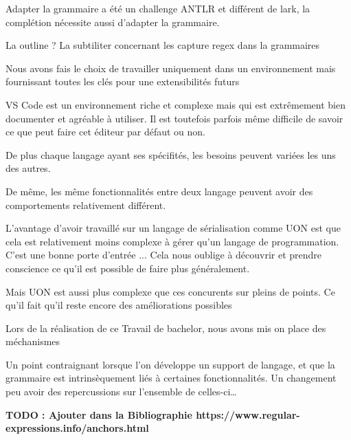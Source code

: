 \documentclass[
    iict, %
    il, %
]{heig-tb}
\begin{document}
Adapter la grammaire a été un challenge ANTLR et différent de lark, la complétion nécessite aussi d'adapter la grammaire.

La outline ?
La subtiliter concernant les capture regex dans la grammaires

Nous avons fais le choix de travailler uniquement dans un environnement mais fournissant toutes les clés pour une extensibilités futurs

VS Code est un environnement riche et complexe mais qui est extrêmement bien documenter et agréable à utiliser.
Il est toutefois parfois même difficile de savoir ce que peut faire cet éditeur par défaut ou non.




De plus chaque langage ayant ses spécifités, les besoins peuvent variées les uns des autres.

De même, les même fonctionnalités entre deux langage peuvent avoir des comportements relativement différent.

L'avantage d'avoir travaillé sur un langage de sérialisation comme UON est que cela est relativement moins complexe à gérer qu'un langage de programmation.
C'est une bonne porte d'entrée ...
Cela nous oublige à découvrir et prendre conscience ce qu'il est possible de faire plus généralement.

Mais UON est aussi plus complexe que ces concurents sur pleins de points.
Ce qu'il fait qu'il reste encore des améliorations possibles

Lors de la réalisation de ce Travail de bachelor, nous avons mis on place des méchanismes


Un point contraignant lorsque l'on développe un support de langage, et que la grammaire est intrinsèquement liés à certaines fonctionnalités.
Un changement peu avoir des repercussions sur l'ensemble de celles-ci\dots




\label{glossaire}
\printnoidxglossary
{}

\textbf{TODO : Ajouter dans la Bibliographie https://www.regular-expressions.info/anchors.html}
\printbibliography
{}

\end{document}

